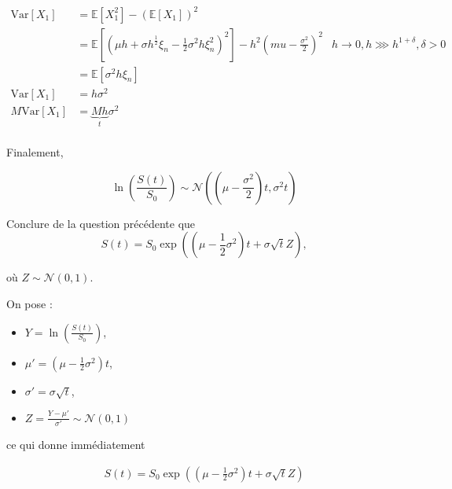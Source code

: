 \documentclass[answers, 10pt]{exam}
\begin{document}
\begin{questions}
\begin{solutionorbox}
		\begin{align*}
			\text{Var}\left[X_1 \right] &= \mathbb{E}\left[X_1^2 \right] - \left( \mathbb{E}\left[X_1 \right] \right)^2\\
						    &= \mathbb{E}\left[\left(\mu h + \sigma h^{\frac{1}{2}} \xi_n - \frac{1}{2} \sigma^2 h \xi_n^2 \right)^2 \right] - h^2 \left( mu - \frac{\sigma^2}{2} \right)^2 & h\to 0, h\ggg h^{1 + \delta}, \delta > 0\\
						    &= \mathbb{E}\left[\sigma^2 h \xi_n \right]\\
			\text{Var}\left[X_1 \right] &= h\sigma^2\\
			M \text{Var}\left[X_1 \right] &= \underbrace{Mh}_{t}\sigma^2\\
		\end{align*}	

		Finalement,

		\begin{equation*}
			\ln \left( \frac{S(t)}{S_0} \right)\sim \mathcal{N} \left( \left( \mu - \frac{\sigma^2}{2}\right)t, \sigma^2 t\right)
		\end{equation*}

	\end{solutionorbox}

	\question
	Conclure de la question précédente que
	\begin{equation*}
		S(t) = S_0 \exp \left(  \left(  \mu - \frac{1}{2}\sigma^2 \right)t + \sigma \sqrt{
		t}Z \right),
	\end{equation*}

	où $Z\sim \mathcal{N}(0, 1)$.
	
	\begin{solutionorbox}
		On pose :
		\begin{itemize}
			\item $Y=\ln \left( \frac{S(t)}{S_0} \right)$,
			\item $\mu' = \left( \mu - \frac{1}{2} \sigma^2 \right)t$,
			\item $\sigma' = \sigma \sqrt{t}$,
			\item $Z = \frac{Y - \mu'}{\sigma'} \sim \mathcal{N}(0, 1)$
		\end{itemize}

		ce qui donne immédiatement 

		\begin{align}%
			\label{eq:st}
			S(t) = S_0\exp \left( \left( \mu - \frac{1}{2}\sigma^2 \right)t + \sigma \sqrt{t}Z\right)
		\end{align}
		

\end{solutionorbox}
\end{questions}
\end{document}
